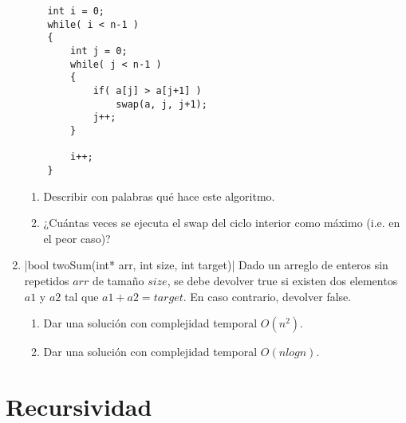 \documentclass[titlepage,oneside]{book}
\begin{document}
\begin{enumerate}
    \begin{verbatim}
    int i = 0;
    while( i < n-1 )
    {
        int j = 0;
        while( j < n-1 )
        {
            if( a[j] > a[j+1] )
                swap(a, j, j+1);
            j++;
        }
        
        i++;
    }
    \end{verbatim} 

    \begin{enumerate}
        \item Describir con palabras qué hace este algoritmo.
        \item ¿Cuántas veces se ejecuta el swap del ciclo interior como máximo (i.e. en el peor caso)?
    \end{enumerate}

    \item{}|bool twoSum(int* arr, int size, int target)|
    Dado un arreglo de enteros sin repetidos $arr$ de tamaño $size$, se debe devolver true si existen dos elementos $a1$ y $a2$ tal que $a1 + a2 = target$. En caso contrario, devolver false.
    \begin{enumerate}
        \item Dar una solución con complejidad temporal $O(n^2)$.
        \item Dar una solución con complejidad temporal $O(n logn)$.
    \end{enumerate}
    
\end{enumerate}

\chapter{Recursividad}
\end{document}
